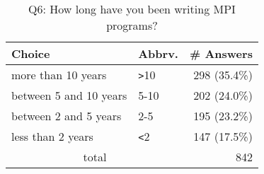 \begin{table}[htb]%
\begin{center}%
\caption{Q6: How long have you been writing MPI programs?}%
\label{tab:Q6-ans}%
\begin{tabular}{l|l|r}%
\hline%
Choice & Abbrv. & \# Answers \\%
\hline%
more than 10 years & \verb!>!10 & 298 (35.4\%) \\%
between 5 and 10 years & 5-10 & 202 (24.0\%) \\%
between 2 and 5 years & 2-5 & 195 (23.2\%) \\%
less than 2 years & \verb!<!2 & 147 (17.5\%) \\%
\hline%
\multicolumn{2}{c}{total} & 842 \\%
\hline%
\end{tabular}%
\end{center}%
\end{table}%

